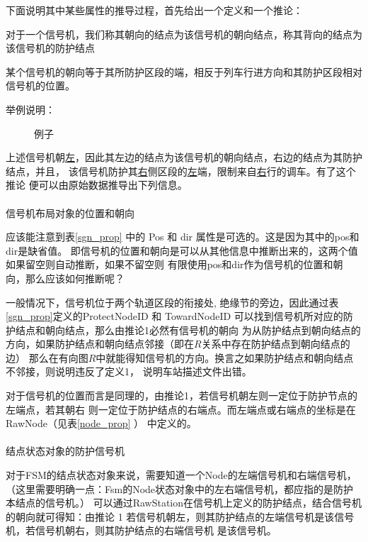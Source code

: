 下面说明其中某些属性的推导过程，首先给出一个定义和一个推论：
\begin{definition}
    对于一个信号机，我们称其朝向的结点为该信号机的朝向结点，称其背向的结点为该信号机的防护结点
\end{definition}
\begin{corollary}
    某个信号机的朝向等于其所防护区段的端，相反于列车行进方向和其防护区段相对信号机的位置。
\end{corollary}
举例说明：

\begin{figure}[htbp!]
    \centering
    
    \caption{\label{ens1}例子}
\end{figure}

上述信号机朝\uline{左}，因此其左边的结点为该信号机的朝向结点，右边的结点为其防护结点，并且，
该信号机防护其\uline{右}侧区段的\uline{左}端，限制来自\uline{右}行的调车。有了这个推论
便可以由原始数据推导出下列信息。

\paragraph{}信号机布局对象的位置和朝向

应该能注意到表\ref{sgn_prop} 中的 Pos 和 dir 属性是可选的。这是因为其中的pos和dir是缺省值。
即信号机的位置和朝向是可以从其他信息中推断出来的，这两个值如果留空则自动推断，如果不留空则
有限使用pos和dir作为信号机的位置和朝向，那么应该如何推断呢？

一般情况下，信号机位于两个轨道区段的衔接处, 绝缘节的旁边，因此通过表\ref{sgn_prop}定义的ProtectNodeID
和 TowardNodeID 可以找到信号机所对应的防护结点和朝向结点，那么由推论1必然有信号机的朝向
为从防护结点到朝向结点的方向，如果防护结点和朝向结点邻接（即在$R$关系中存在防护结点到朝向结点的边）
那么在有向图$R$中就能得知信号机的方向。换言之如果防护结点和朝向结点不邻接，则说明违反了定义1，
说明车站描述文件出错。

对于信号机的位置而言是同理的，由推论1，若信号机朝左则一定位于防护节点的左端点，若其朝右
则一定位于防护结点的右端点。而左端点或右端点的坐标是在RawNode（见表\ref{node_prop} ）
中定义的。

\paragraph{}结点状态对象的防护信号机

对于FSM的结点状态对象来说，需要知道一个Node的左端信号机和右端信号机，
（这里需要明确一点：Fsm的Node状态对象中的左右端信号机，都应指的是防护本结点的信号机。）
可以通过RawStation在信号机上定义的防护结点，结合信号机的朝向就可得知：由推论 1
若信号机朝左，则其防护结点的左端信号机是该信号机，若信号机朝右，则其防护结点的右端信号机
是该信号机。

